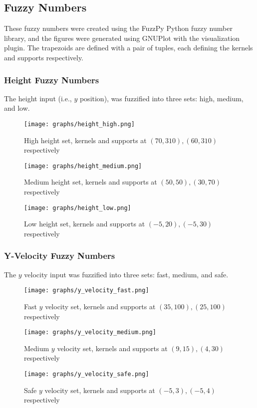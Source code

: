 \documentclass[12pt, article]{scrartcl}
\begin{document}
\subsection{Fuzzy Numbers}
These fuzzy numbers were created using the FuzzPy Python fuzzy number library, and the figures were generated using GNUPlot with the visualization plugin. The trapezoids are defined with a pair of tuples, each defining the kernels and supports respectively.

\subsubsection{Height Fuzzy Numbers}
The height input (i.e., $y$ position), was fuzzified into three sets: high, medium, and low.
\begin{figure}[h]
    \centering
    \caption{High height set, kernels and supports at $(70, 310), (60, 310)$ respectively}
    \texttt{[image: graphs/height\_high.png]}
\end{figure}
\begin{figure}[h]
    \centering
    \caption{Medium height set, kernels and supports at $(50, 50), (30, 70)$ respectively}
    \texttt{[image: graphs/height\_medium.png]}
\end{figure}
\begin{figure}[h]
    \centering
    \caption{Low height set, kernels and supports at $(-5, 20), (-5, 30)$ respectively}
    \texttt{[image: graphs/height\_low.png]}
\end{figure}

\subsubsection{Y-Velocity Fuzzy Numbers}
The $y$ velocity input was fuzzified into three sets: fast, medium, and safe.
\begin{figure}[h]
    \centering
    \caption{Fast $y$ velocity set, kernels and supports at $(35, 100), (25, 100)$ respectively}
    \texttt{[image: graphs/y\_velocity\_fast.png]}
\end{figure}
\begin{figure}[h]
    \centering
    \caption{Medium $y$ velocity set, kernels and supports at $(9, 15), (4, 30)$ respectively}
    \texttt{[image: graphs/y\_velocity\_medium.png]}
\end{figure}
\begin{figure}[h]
    \centering
    \caption{Safe $y$ velocity set, kernels and supports at $(-5, 3), (-5, 4)$ respectively}
    \texttt{[image: graphs/y\_velocity\_safe.png]}
\end{figure}
\end{document}
